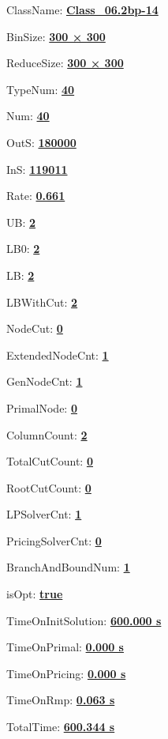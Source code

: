 \documentclass[11pt]{article}
\begin{document}
\pagestyle{empty}


ClassName: \underline{\textbf{Class_06.2bp-14}}
\par
BinSize: \underline{\textbf{300 × 300}}
\par
ReduceSize: \underline{\textbf{300 × 300}}
\par
TypeNum: \underline{\textbf{40}}
\par
Num: \underline{\textbf{40}}
\par
OutS: \underline{\textbf{180000}}
\par
InS: \underline{\textbf{119011}}
\par
Rate: \underline{\textbf{0.661}}
\par
UB: \underline{\textbf{2}}
\par
LB0: \underline{\textbf{2}}
\par
LB: \underline{\textbf{2}}
\par
LBWithCut: \underline{\textbf{2}}
\par
NodeCut: \underline{\textbf{0}}
\par
ExtendedNodeCnt: \underline{\textbf{1}}
\par
GenNodeCnt: \underline{\textbf{1}}
\par
PrimalNode: \underline{\textbf{0}}
\par
ColumnCount: \underline{\textbf{2}}
\par
TotalCutCount: \underline{\textbf{0}}
\par
RootCutCount: \underline{\textbf{0}}
\par
LPSolverCnt: \underline{\textbf{1}}
\par
PricingSolverCnt: \underline{\textbf{0}}
\par
BranchAndBoundNum: \underline{\textbf{1}}
\par
isOpt: \underline{\textbf{true}}
\par
TimeOnInitSolution: \underline{\textbf{600.000 s}}
\par
TimeOnPrimal: \underline{\textbf{0.000 s}}
\par
TimeOnPricing: \underline{\textbf{0.000 s}}
\par
TimeOnRmp: \underline{\textbf{0.063 s}}
\par
TotalTime: \underline{\textbf{600.344 s}}
\par
\newpage
\end{document}

